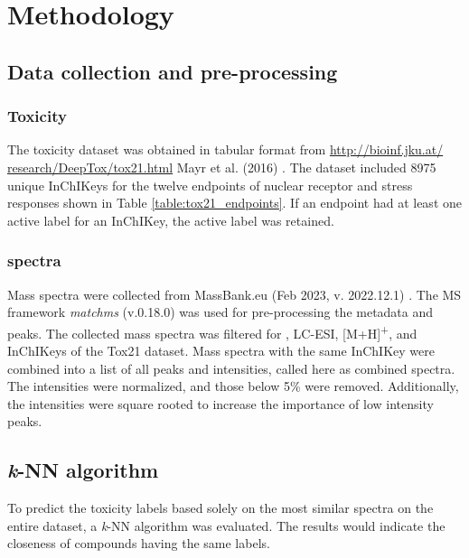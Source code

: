 \chapter{Methodology}
\section*{Data collection and pre-processing}
\label{section:data_processing}

\subsection*{Toxicity}
The toxicity dataset was obtained in tabular format from \href{http://bioinf.jku.at/research/DeepTox/tox21.html}{http://bioinf.jku.at/ research/DeepTox/tox21.html}  Mayr et al. (2016) \cite{mayr_deeptox_2016}\cite{Huang2016}. The dataset included 8975 unique InChIKeys for the twelve endpoints of nuclear receptor and stress responses shown in Table \ref{table:tox21_endpoints}. If an endpoint had at least one active label for an InChIKey, the active label was retained. 

\subsection*{\tMS{} spectra}
Mass spectra were collected from MassBank.eu (Feb 2023, v. 2022.12.1) \cite{MassBank}. The MS framework \textit{matchms} (v.0.18.0) \cite{huber2020matchms} was used for pre-processing the metadata and peaks. The collected mass spectra was filtered for \tMS{}, LC-ESI, [M+H]\textsuperscript{+}, and InChIKeys of the Tox21 dataset. Mass spectra with the same InChIKey were combined into a list of all peaks and intensities, called here as combined spectra. The intensities were normalized, and those below 5\% were removed. Additionally, the intensities were square rooted to increase the importance of low intensity peaks. 

\section*{{\textit{k}-NN} algorithm}

To predict the toxicity labels based solely on the most similar spectra on the entire dataset, a \textit{k}-NN algorithm was evaluated. The results would indicate the closeness of compounds having the same labels. 

